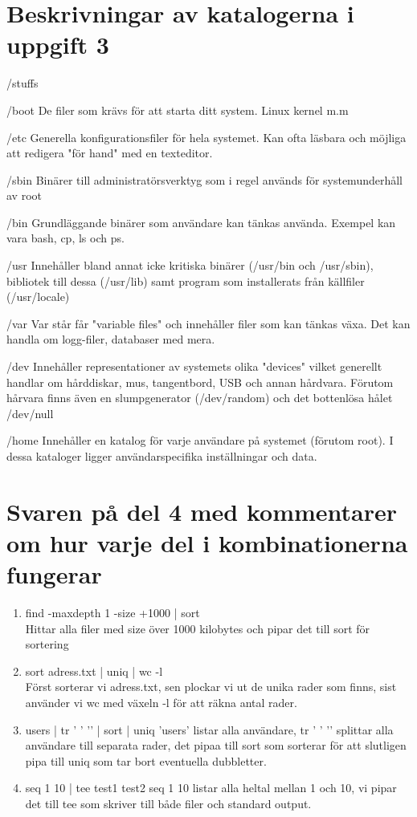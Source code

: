 \documentclass[11pt]{article}
\begin{document}
\section{Beskrivningar av katalogerna i uppgift 3}
\begin{labeling}{/stuffs}
\item [/boot] De filer som krävs för att starta ditt system. Linux kernel m.m
\item [/etc] Generella konfigurationsfiler för hela systemet. Kan ofta läsbara och möjliga att redigera "för hand" med en texteditor.
\item [/sbin] Binärer till administratörsverktyg som i regel används för systemunderhåll av root
\item [/bin] Grundläggande binärer som användare kan tänkas använda. Exempel kan vara bash, cp, ls och ps.
\item [/usr] Innehåller bland annat icke kritiska binärer (/usr/bin och /usr/sbin), bibliotek till dessa (/usr/lib) samt program som installerats från källfiler (/usr/locale)
\item [/var] Var står får "variable files" och innehåller filer som kan tänkas växa. Det kan handla om logg-filer, databaser med mera.
\item [/dev] Innehåller representationer av systemets olika "devices" vilket generellt handlar om hårddiskar, mus, tangentbord, USB och annan hårdvara. Förutom hårvara finns även en slumpgenerator (/dev/random) och det bottenlösa hålet /dev/null
\item [/home] Innehåller en katalog för varje användare på systemet (förutom root). I dessa kataloger ligger användarspecifika inställningar och data.
\end{labeling}

\section{Svaren på del 4 med kommentarer om hur varje del i kombinationerna fungerar}
\begin{enumerate}[label=(\alph*)]
\item find -maxdepth 1 -size  +1000 | sort \\
Hittar alla filer med size över 1000 kilobytes och pipar det till sort för sortering
\item sort adress.txt | uniq | wc -l \\
Först sorterar vi adress.txt, sen plockar vi ut de unika rader som finns, sist använder vi wc med växeln -l för att räkna antal rader.
\item users | tr ' ' '\n' | sort | uniq
'users' listar alla användare, tr ' ' '\n' splittar alla användare till separata rader, det pipaa till sort som sorterar för att slutligen pipa till uniq som tar bort eventuella dubbletter.
\item seq 1 10 | tee test1 test2
seq 1 10 listar alla heltal mellan 1 och 10, vi pipar det till tee som skriver till både filer och standard output.
\end{enumerate}
\end{document}
